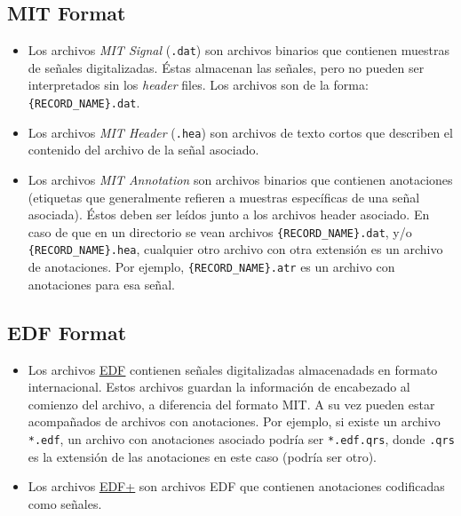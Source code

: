 \subsection*{MIT Format}
\begin{itemize}
    \item Los archivos \textit{MIT Signal} (\texttt{.dat}) son archivos binarios que contienen muestras de señales digitalizadas. Éstas almacenan las señales, pero no pueden ser interpretados sin los \textit{header} files.  Los archivos son de la forma: \texttt{\{RECORD\_NAME\}.dat}.
    
    \item Los archivos \textit{MIT Header} (\texttt{.hea}) son archivos de texto cortos que describen el contenido del archivo de la señal asociado.
    
    \item Los archivos \textit{MIT Annotation} son archivos binarios que contienen anotaciones (etiquetas que generalmente refieren a muestras específicas de una señal asociada). Éstos deben ser leídos junto a los archivos header asociado. En caso de que en un directorio se vean archivos \texttt{\{RECORD\_NAME\}.dat}, y/o \texttt{\{RECORD\_NAME\}.hea}, cualquier otro archivo con otra extensión es un archivo de anotaciones. Por ejemplo, \texttt{\{RECORD\_NAME\}.atr} es un archivo con anotaciones para esa señal.
\end{itemize}

\subsection*{EDF Format}
\begin{itemize}
    \item Los archivos \href{http://www.edfplus.info/specs/edf.html}{\underline{EDF}} contienen señales digitalizadas almacenadads en formato internacional. Estos archivos guardan la información de encabezado al comienzo del archivo, a diferencia del formato MIT. A su vez pueden estar acompañados de archivos con anotaciones. Por ejemplo, si existe un archivo \texttt{*.edf}, un archivo con anotaciones asociado podría ser \texttt{*.edf.qrs}, donde \texttt{.qrs} es la extensión de las anotaciones en este caso (podría ser otro).
    
    \item Los archivos 
    \href{http://www.edfplus.info/specs/edfplus.html}{\underline{EDF+}} son archivos EDF que contienen anotaciones codificadas como señales.
\end{itemize}

